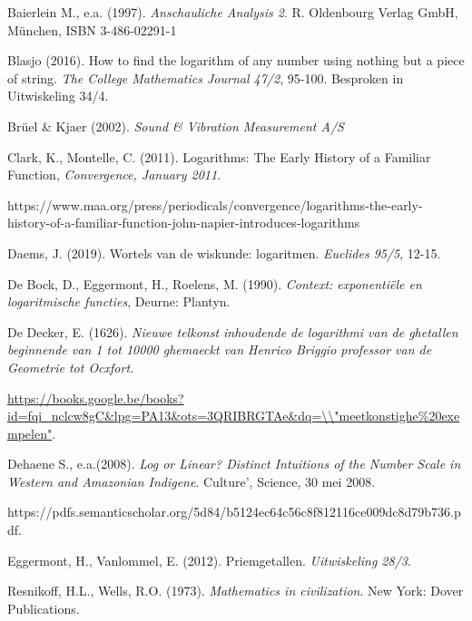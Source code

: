 \begin{bronnen}

\item Baierlein M., e.a. (1997). \emph{Anschauliche Analysis 2}. R. Oldenbourg Verlag GmbH, München,  ISBN 3-486-02291-1

\item Blasjo (2016). How to find the logarithm of any number using nothing but a piece of string. \emph{The College Mathematics Journal 47/2}, 95-100. Besproken in Uitwiskeling 34/4.

\item Brüel \& Kjaer (2002). \emph{Sound \& Vibration Measurement A/S}

\item Clark, K., Montelle, C. (2011). Logarithms: The Early History of a Familiar Function, \emph{Convergence, January 2011}. 

https://www.maa.org/press/periodicals/convergence/logarithms-the-early-history-of-a-familiar-function-john-napier-introduces-logarithms

\item Daems, J. (2019). Wortels van de wiskunde: logaritmen. \emph{Euclides 95/5}, 12-15.

\item De Bock, D., Eggermont, H., Roelens, M. (1990). \emph{Context: exponentiële en logaritmische functies}, Deurne: Plantyn. 

\item De Decker, E. (1626). \emph{Nieuwe telkonst inhoudende de logarithmi van de ghetallen beginnende van 1 tot 10000 ghemaeckt van Henrico Briggio professor van de Geometrie tot Ocxfort.}

\url{https://books.google.be/books?id=fqi_nclcw8gC&lpg=PA13&ots=3QRIBRGTAe&dq=\\"meetkonstighe\%20exempelen"}.

\item Dehaene S., e.a.(2008). \emph{Log or Linear? Distinct Intuitions of the Number Scale in Western and Amazonian Indigene}. Culture’, Science, 30 mei 2008.

https://pdfs.semanticscholar.org/5d84/b5124ec64c56c8f812116ce009dc8d79b736.pdf.

\item Eggermont, H., Vanlommel, E. (2012). Priemgetallen. \emph{Uitwiskeling 28/3}.

\item Resnikoff, H.L., Wells, R.O. (1973). \emph{Mathematics in civilization}. New York: Dover Publications.


\end{bronnen}
